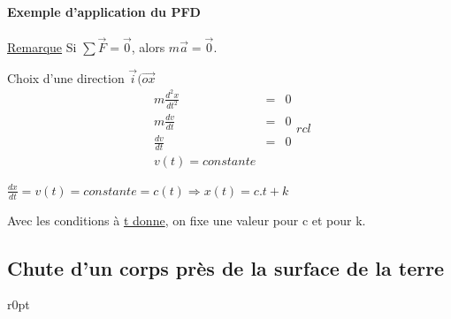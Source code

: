 \paragraph{Exemple d'application du PFD} 

\ul{Remarque} Si $\sum \vec{F}=\vec{0}$, alors $m\vec{a}=\vec{0}$.

Choix d'une direction $\vec{i} (\overrightarrow{ox}$ \[\begin{array}{rcl}
	m\frac{d^2x}{dt^2} &=& 0 \\
	m\frac{dv}{dt} &=& 0 \\
	\frac{dv}{dt} &=& 0 \\
v(t) = constante \end{array}{rcl} \]

$\frac{dx}{dt} = v(t) = constante = c(t) \Rightarrow x(t) = c.t + k$

Avec les conditions à \ul{t donne}, on fixe une valeur pour c et pour k.

\subsection{Chute d'un corps près de la surface de la terre}

\begin{wrapfigure}[5]{r}{0pt}
\end{wrapfigure}

